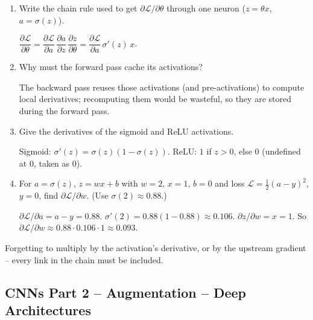 \documentclass[10pt,a4paper]{article}
\newcommand{\q}[1]{\item #1}
\begin{document}
\begin{enumerate}[leftmargin=*,label=\textbf{Q\arabic*.}]

\q Write the chain rule used to get $\partial \mathcal{L}/\partial \theta$ through one neuron ($z = \theta x$, $a = \sigma(z)$).
\begin{answerbox}
$\dfrac{\partial \mathcal{L}}{\partial \theta} = \dfrac{\partial \mathcal{L}}{\partial a}\,\dfrac{\partial a}{\partial z}\,\dfrac{\partial z}{\partial \theta} = \dfrac{\partial \mathcal{L}}{\partial a}\,\sigma'(z)\,x$.
\end{answerbox}

\q Why must the forward pass cache its activations?
\begin{answerbox}
The backward pass reuses those activations (and pre-activations) to compute local derivatives; recomputing them would be wasteful, so they are stored during the forward pass.
\end{answerbox}

\q Give the derivatives of the sigmoid and ReLU activations.
\begin{answerbox}
Sigmoid: $\sigma'(z) = \sigma(z)(1-\sigma(z))$. ReLU: $1$ if $z>0$, else $0$ (undefined at $0$, taken as $0$).
\end{answerbox}

\q For $a = \sigma(z)$, $z = wx+b$ with $w=2,\,x=1,\,b=0$ and loss $\mathcal{L} = \tfrac12(a-y)^2$, $y=0$, find $\partial\mathcal{L}/\partial w$. (Use $\sigma(2)\approx0.88$.)
\begin{answerbox}
$\partial\mathcal{L}/\partial a = a - y = 0.88$. $\sigma'(2)=0.88(1-0.88)\approx0.106$. $\partial z/\partial w = x = 1$. So $\partial\mathcal{L}/\partial w \approx 0.88 \cdot 0.106 \cdot 1 \approx 0.093$.
\end{answerbox}

\end{enumerate}

\begin{examtipbox}
Forgetting to multiply by the activation's derivative, or by the upstream gradient -- every link in the chain must be included.
\end{examtipbox}

\subsection{CNNs Part 2 -- Augmentation -- Deep Architectures}
\end{document}
